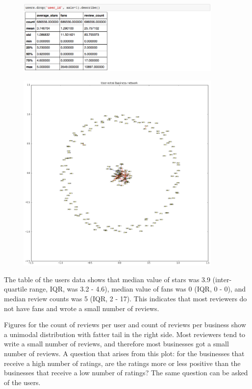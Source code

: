 \documentclass[11pt]{article}
\begin{document}
\begin{figure}[!htb]
\centering
\includegraphics[width=0.9\textwidth]{./ac209/userdescribe.png}
\end{figure}

\begin{figure}[!htb]
\centering
\includegraphics[width=0.9\textwidth]{./ac209/networkanalysis.png}
\end{figure}

\par The table of the users data shows that median value of stars was 3.9 (inter-quartile range, IQR, was 3.2 - 4.6), median value of fans was 0 (IQR, 0 - 0), and median review counts was 5 (IQR, 2 - 17). This indicates that most reviewers do not have fans and wrote a small number of reviews.

\par Figures for the count of reviews per user and count of reviews per business show a unimodal distribution with fatter tail in the right side. Most reviewers tend to write a small number of reviews, and therefore most businesses got a small number of reviews. A question that arises from this plot: for the businesses that receive a high number of ratings, are the ratings more or less positive than the businesses that receive a low number of ratings? The same question can be asked of the users.
\end{document}
